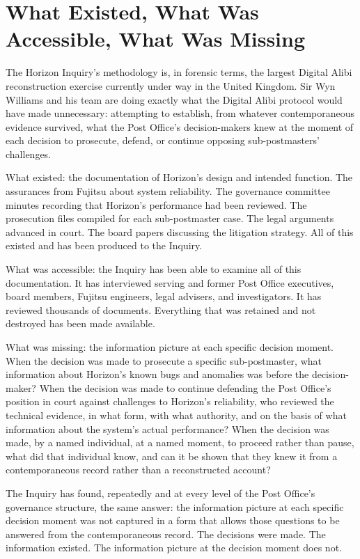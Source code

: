 \scenebreak

\section{What Existed, What Was Accessible, What Was Missing}

The Horizon Inquiry's methodology is, in forensic terms, the largest Digital Alibi reconstruction exercise currently under way in the United Kingdom. Sir Wyn Williams and his team are doing exactly what the Digital Alibi protocol would have made unnecessary: attempting to establish, from whatever contemporaneous evidence survived, what the Post Office's decision-makers knew at the moment of each decision to prosecute, defend, or continue opposing sub-postmasters' challenges.

What existed: the documentation of Horizon's design and intended function. The assurances from Fujitsu about system reliability. The governance committee minutes recording that Horizon's performance had been reviewed. The prosecution files compiled for each sub-postmaster case. The legal arguments advanced in court. The board papers discussing the litigation strategy. All of this existed and has been produced to the Inquiry.

What was accessible: the Inquiry has been able to examine all of this documentation. It has interviewed serving and former Post Office executives, board members, Fujitsu engineers, legal advisers, and investigators. It has reviewed thousands of documents. Everything that was retained and not destroyed has been made available.

What was missing: the information picture at each specific decision moment. When the decision was made to prosecute a specific sub-postmaster, what information about Horizon's known bugs and anomalies was before the decision-maker? When the decision was made to continue defending the Post Office's position in court against challenges to Horizon's reliability, who reviewed the technical evidence, in what form, with what authority, and on the basis of what information about the system's actual performance? When the decision was made, by a named individual, at a named moment, to proceed rather than pause, what did that individual know, and can it be shown that they knew it from a contemporaneous record rather than a reconstructed account?

The Inquiry has found, repeatedly and at every level of the Post Office's governance structure, the same answer: the information picture at each specific decision moment was not captured in a form that allows those questions to be answered from the contemporaneous record. The decisions were made. The information existed. The information picture at the decision moment does not.

